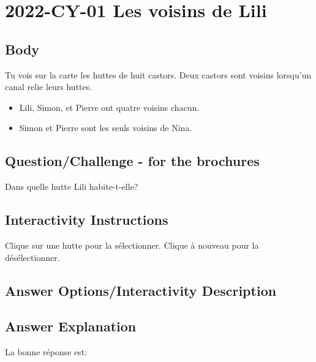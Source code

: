 \documentclass[a4paper,11pt]{report}
\newcommand{\taskGraphicsFolder}{..}
\begin{document}
\section*{\centering{} 2022-CY-01 Les voisins de Lili}


\subsection*{Body}

Tu vois sur la carte les huttes de huit castors. Deux castors sont voisins lorsqu’un canal relie leurs huttes.

\begin{itemize}
  \item Lili, Simon, et Pierre ont quatre voisins chacun.
  \item Simon et Pierre sont les seuls voisins de Nina.
\end{itemize}

{\em


\subsection*{Question/Challenge - for the brochures}

Dans quelle hutte Lili habite-t-elle?

{\centering%
\par}

}


\subsection*{Interactivity Instructions}

Clique sur une hutte pour la sélectionner. Clique à nouveau pour la désélectionner.

\begingroup
\renewcommand{\arraystretch}{1.5}
\subsection*{Answer Options/Interactivity Description}



\endgroup

\subsection*{Answer Explanation}

La bonne réponse est:
\end{document}
